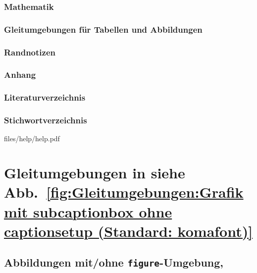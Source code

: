 \section{Mathematik}
\label{sec:Einfuehrung:Hauptklassen:Mathematik}
\lipsum[1-1]
\section{Gleitumgebungen für Tabellen und Abbildungen}
\label{sec:Einfuehrung:Hauptklassen:Gleitumgebungen}
\lipsum[1-1]
\section{Randnotizen}
\label{sec:Einfuehrung:Hauptklassen:Randnotizen}
\lipsum[1-1]
\section{Anhang}
\label{sec:Einfuehrung:Hauptklassen:Anhang}
\lipsum[1-1]
\section{Literaturverzeichnis}
\label{sec:Einfuehrung:Hauptklassen:Literaturverzeichnis}
\lipsum[1-1]
\section{Stichwortverzeichnis}
\label{sec:Einfuehrung:Hauptklassen:Stichwortverzeichnis}
\lipsum[1-1]

\clearpage{}%
	{files/help/help.pdf}%
\clearpage\TUMStandardAreaMain%

\part{Gleitumgebungen in \texorpdfstring{ siehe Abb.~\ref{fig:Gleitumgebungen:Grafik mit subcaptionbox ohne captionsetup (Standard: komafont)}}{scrbook}}
\label{part:Gleitumgebungen in scrbook}
\chapter{Abbildungen mit/ohne \texttt{figure}-Umgebung\texorpdfstring{, \cite{LabenbacherTeX}}{}}
\label{chap:Gleitumgebungen:Abbildungen figure-Umgebung}

